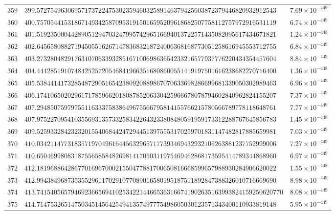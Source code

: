 \documentclass[12pt,reqno]{amsart}
\theoremstyle{remark}
\begin{document}
\begin{longtable}{clc}
$359$ & $399.5727549630695717372247530235946032589146379425603872379446820932912543$ & $7.69\times 10^{-449}$ \\
$360$ & $400.7570544153186714934258709531915016595209618682507758112757972916531119$ & $6.74\times 10^{-449}$ \\
$361$ & $401.5192350004428905129470324799574296516694013722571435082095617434671821$ & $1.24\times 10^{-448}$ \\
$362$ & $402.6456580882719450551626714783683218724006368168773051258616945553712755$ & $6.84\times 10^{-449}$ \\
$363$ & $403.2732804829176310706339328516710069863654233216577937776220434354457604$ & $8.84\times 10^{-449}$ \\
$364$ & $404.4442851910748425257205468419663516808600551419197501616238682270716400$ & $1.36\times 10^{-448}$ \\
$365$ & $405.5384414173285487290516542380920889867070633698286699681339050302989463$ & $6.96\times 10^{-449}$ \\
$366$ & $406.1741065020296171785966201808785206330425966678078794602840962824155207$ & $7.37\times 10^{-449}$ \\
$367$ & $407.2948507597975511633375838649675566795814155766215780566789778118648761$ & $7.77\times 10^{-449}$ \\
$368$ & $407.9752270954103556931357332583422643233808480591959173312288767645856783$ & $1.45\times 10^{-448}$ \\
$369$ & $409.5259332842323201554068442472944513975553170259701831147482817885659981$ & $7.03\times 10^{-449}$ \\
$370$ & $410.0342114773183571970496164456329657177393469432932105263881237752999006$ & $7.27\times 10^{-449}$ \\
$371$ & $410.6504699808318755658584826981417050311975469462868173595414789344868960$ & $6.97\times 10^{-449}$ \\
$372$ & $412.1819688642867701696700021550477881700650816668599657988930284906620022$ & $1.55\times 10^{-448}$ \\
$373$ & $412.9943849687353552961170291077089016580195187511892847388326010716669690$ & $8.98\times 10^{-449}$ \\
$374$ & $413.741540565794692366569410253422144665363166741902635163993824159250620770$ & $8.08\times 10^{-449}$ \\
$375$ & $414.7147532651475034514564254941357497775498605030123571343400110933819148$ & $5.95\times 10^{-449}$ \\

\end{longtable}
\end{document}

